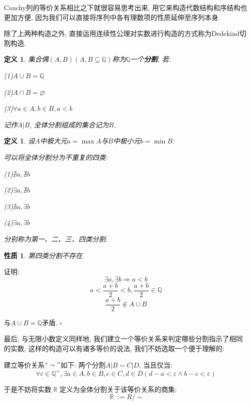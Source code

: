 \documentclass[UTF8]{ctexart}
\newcommand{\<}{\langle}
\renewcommand{\>}{\rangle}
\DeclareMathOperator{\R}{\mathbb{R}}
\newtheorem{dfn}[thm]{定义}
\newtheorem{ppt}{性质}[thm]
\begin{document}
            Cauchy列的等价关系相比之下就很容易思考出来, 用它来构造代数结构和序结构也更加方便, 因为我们可以直接将序列中各有理数项的性质延伸至序列本身. 

            除了上两种构造之外, 直接运用连续性公理对实数进行构造的方式称为Dedekind切割构造. 
        
            \begin{dfn}
				集合偶$(A,B)(A,B\subseteq\mathbb{Q})$称为$\mathbb{Q}$一个\textbf{分割}, 若: 
				
				(1)$A\cup B=\mathbb{Q}$
				
				(2)$A\cap B=\varnothing$
				
				(3)$\forall a\in A, b\in B, a<b$
				
				记作$A|B$, 全体分割组成的集合记为$R$. 
			\end{dfn}
			
			\begin{dfn}
				设$A$中极大元$a=\max A$与$B$中极小元$b=\min B$: 
				
				可以将全体分割分为不重复的四类: 
				
				(1)$\nexists a, \nexists b$
				
				(2)$\exists a, \nexists b$
				
				(3)$\nexists a, \exists b$
				
				(4)$\exists a, \exists b$
				
				分别称为第一、二、三、四类分割. 
			\end{dfn}
			
			\begin{ppt}
				第四类分割不存在. 
			\end{ppt}
			
			证明: 
				\[\exists a, \exists b\Rightarrow a<b\]
				\[a<\frac{a+b}{2}<b, \frac{a+b}{2}\in\mathbb{Q}\]
				\[\frac{a+b}{2}\notin A\cup B\]
				
				与$A\cup B=\mathbb{Q}$矛盾. $\square$
            
            最后, 与无限小数定义同样地, 我们建立一个等价关系来判定哪些分割指示了相同的实数, 这样的构造可以有诸多等价的说法, 我们不妨选取一个便于理解的: 

            建立等价关系$``\sim"$如下: 两个分割$A|B\sim C|D$, 当且仅当: 
            \[\forall\varepsilon\in\mathbb{Q}^+, \exists a\in A, b\in B, c\in C, d\in D(d-a<\varepsilon\wedge b-c<\varepsilon)\]
            
            于是不妨将实数$\R$定义为全体分割关于该等价关系的商集: 
            \[\R:=R/\sim\]
\end{document}
